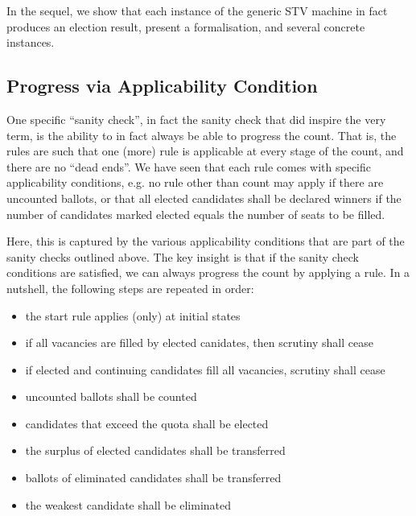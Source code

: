 \documentclass{llncs}
\begin{document}
\noindent
In the sequel, we show that each instance of the generic STV machine
in fact produces an election result, present a formalisation, and
several concrete instances.

\subsection{Progress via Applicability Condition}
  

One specific ``sanity check'', in fact the sanity check that did
inspire the very term, is the ability to in fact always be able to
progress the count. That is, the rules are such that one (more) rule
is applicable at every stage of the count, and there are no ``dead
ends''. We have seen that each rule comes with specific
applicability conditions, e.g. no rule other than count may apply if
there are uncounted ballots, or that all elected candidates shall be
declared winners if the number of candidates marked elected equals
the number of seats to be filled.  

Here, this is captured by the various applicability conditions that
are part of the sanity checks outlined above. The key insight is
that if the sanity check conditions are satisfied, we can always
progress the count by applying a rule. In a nutshell, the following
steps are repeated in order:
\begin{itemize}
  \item the start rule applies (only) at initial states
  \item if all vacancies are filled by elected canidates, then scrutiny shall cease
  \item if elected and continuing candidates fill all vacancies,
  scrutiny shall cease
  \item uncounted ballots shall be counted
  \item candidates that exceed the quota shall be 
  elected
  \item the surplus of elected candidates shall be transferred 
  \item ballots of eliminated candidates shall be transferred
  \item the weakest candidate shall be eliminated
\end{itemize}
\end{document}
